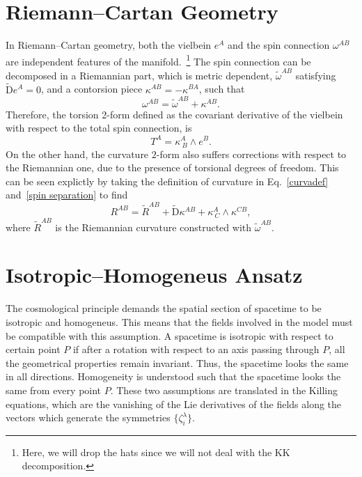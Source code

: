 \documentclass[aps,prd,12pt,superscriptaddress,showpacs,showkeys,longbibliography,reprint,nofootinbib]{revtex4-1}
\begin{document}
\appendix

\section{Riemann--Cartan Geometry\label{Riemann-Cartan}}

In Riemann--Cartan geometry, both the vielbein $e^A$ and the spin connection $\omega^{AB}$ are independent features of the manifold.~\footnote{Here, we will drop the hats since we will not deal with the KK decomposition.} The spin connection can be decomposed in a Riemannian part, which is metric dependent, $\tilde{\omega}^{AB}$ satisfying $\tilde{\mbox{D}}e^A=0$, and a contorsion piece $\kappa^{AB}=-\kappa^{BA}$, such that 
\begin{equation}\label{spin separation}
  \omega^{AB}=\tilde{\omega}^{AB}+\kappa^{AB}.
\end{equation} 
Therefore, the torsion 2-form defined as the covariant derivative of the vielbein with respect to the total spin connection, is
\begin{equation}
  T^A=\kappa^A_{\ B}\wedge e^B.
\end{equation}
On the other hand, the curvature $2$-form also suffers corrections with respect to the Riemannian one, due to the presence of torsional degrees of freedom. This can be seen explictly by taking the definition of curvature in Eq.~\eqref{curvadef} and~\eqref{spin separation} to find
\begin{equation}\label{curvature decomp}
  R^{AB} = \tilde{R}^{AB} + \tilde{\mbox{D}}\kappa^{AB} + \kappa^A_{\ C}\wedge\kappa^{CB},
\end{equation}
where $\tilde{R}^{AB}$ is the Riemannian curvature constructed with $\tilde{\omega}^{AB}$.


\section{Isotropic--Homogeneus Ansatz\label{homotropic}}

The cosmological principle demands the spatial section of spacetime to be isotropic and homogeneus. This means that the fields involved in the model must be compatible with this assumption. A spacetime is isotropic with respect to certain point $P$ if after a rotation with respect to an axis passing through $P$, all the geometrical properties remain invariant. Thus, the spacetime looks the same in all directions. Homogeneity is understood such that the spacetime looks the same from every point $P$. These two assumptions are translated in the Killing equations, which are the vanishing of the Lie derivatives of the fields along the vectors which generate the symmetries $\{\zeta^\lambda_{i}\}$. 
\end{document}
